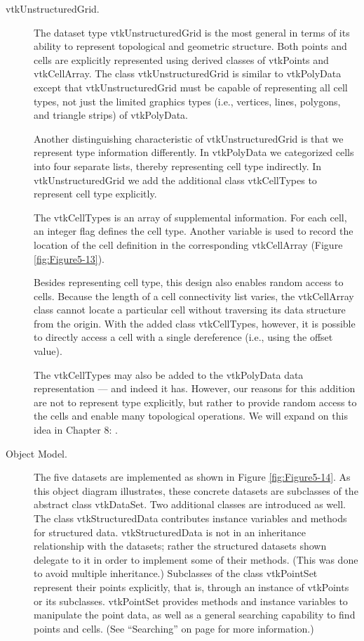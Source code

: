 \begin{description}
\item[vtkUnstructuredGrid.] The dataset type vtkUnstructuredGrid is the most general in terms of its ability to represent topological and geometric structure. Both points and cells are explicitly represented using derived classes of vtkPoints and vtkCellArray. The class vtkUnstructuredGrid is similar to vtkPolyData except that vtkUnstructuredGrid must be capable of representing all cell types, not just the limited graphics types (i.e., vertices, lines, polygons, and triangle strips) of vtkPolyData.

Another distinguishing characteristic of vtkUnstructuredGrid is that we represent type information differently. In vtkPolyData we categorized cells into four separate lists, thereby representing cell type indirectly. In vtkUnstructuredGrid we add the additional class vtkCellTypes to represent cell type explicitly.

The vtkCellTypes is an array of supplemental information. For each cell, an integer flag defines the cell type. Another variable is used to record the location of the cell definition in the corresponding vtkCellArray (Figure \ref{fig:Figure5-13}).

Besides representing cell type, this design also enables random access to cells. Because the length of a cell connectivity list varies, the vtkCellArray class cannot locate a particular cell without traversing its data structure from the origin. With the added class vtkCellTypes, however, it is possible to directly access a cell with a single dereference (i.e., using the offset value).

The vtkCellTypes may also be added to the vtkPolyData data representation  --- and indeed it has. However, our reasons for this addition are not to represent type explicitly, but rather to provide random access to the cells and enable many topological operations. We will expand on this idea in Chapter 8: .

\item[Object Model.] The five datasets are implemented as shown in Figure \ref{fig:Figure5-14}. As this object diagram illustrates, these concrete datasets are subclasses of the abstract class vtkDataSet. Two additional classes are introduced as well. The class vtkStructuredData contributes instance variables and methods for structured data. vtkStructuredData is not in an inheritance relationship with the datasets; rather the structured datasets shown delegate to it in order to implement some of their methods. (This was done to avoid multiple inheritance.) Subclasses of the class vtkPointSet represent their points explicitly, that is, through an instance of vtkPoints or its subclasses. vtkPointSet provides methods and instance variables to manipulate the point data, as well as a general searching capability to find points and cells. (See ``Searching'' on page \pageref{sec:searching} for more information.)

\end{description}


